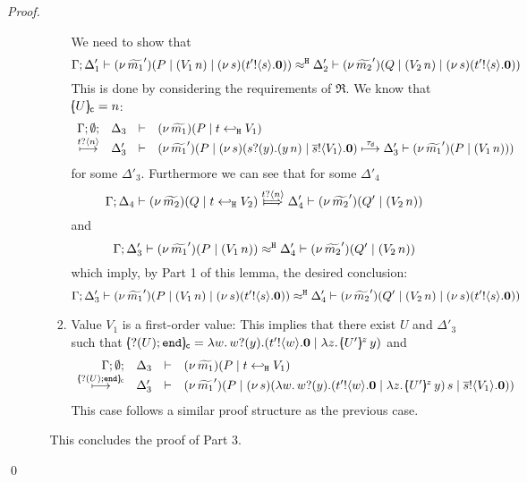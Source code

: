 \begin{proof}
\begin{enumerate}[$-$]
\begin{enumerate}[(a)]
\begin{enumerate}
							We need to show that
							\[
								\Gamma; \Delta_1' \vdash (\nu\, \widetilde{m_1}')(P \;|\; (V_1\, {n}) \;|\; (\nu\, s)(t' ! \langle s \rangle . \mathbf{0})) \approx^\mathtt{H} \Delta_2' \vdash (\nu\, \widetilde{m_2}')(Q \;|\; (V_2\, {n}) \;|\; (\nu\, s)(t' ! \langle s \rangle . \mathbf{0}))
							\]
							This is done by considering the requirements of $\Re$.
							We know that $[\!\!(U)\!\!]_{\mathsf{c}} = n$:
							\[
								\begin{array}{rcll} \Gamma; \emptyset; &\Delta_3& \vdash& (\nu\, \widetilde{m_1})(P \;|\; t \hookleftarrow_{\mathtt{H}} V_1  ) \\ \stackrel{t ? \langle n \rangle}{\longmapsto} &\Delta_3'& \vdash &  (\nu\, \widetilde{m_1}')(P \;|\; (\nu\, s)(s ? (y) . (y\, {n}) \;|\; \overline{s} ! \langle V_1 \rangle . \mathbf{0})  \stackrel{\tau_{\mathsf{d}}}{\longmapsto} \Delta'_3 \vdash (\nu\, \widetilde{m_1}')(P \;|\; (V_1\, {n})) ) \end{array} 
							\]
							for some $\Delta'_3$.
							Furthermore we can see that for some $\Delta'_4$
							\[
								\horel{\Gamma}{\Delta_4}{\newsp{\widetilde{m_2}}{Q \Par \htrigger{t}{V_2}  } }
								{\Hby{\bactinp{t}{n}}}
								{\Delta_4'}{\newsp{\widetilde{m_2}'}{Q' \Par (\appl{V_2}{n})}}
							\]
							and
							\[
								\Gamma; \Delta_3' \vdash (\nu\, \widetilde{m_1}')(P \;|\; (V_1\, {n})) \approx^\mathtt{H} \Delta_4' \vdash (\nu\, \widetilde{m_2}')(Q' \;|\; (V_2\, {n}))
							\]
							which imply, by Part 1 of this lemma, the desired conclusion:
							\[
								\Gamma; \Delta_3' \vdash (\nu\, \widetilde{m_1}')(P \;|\; (V_1\, {n}) \;|\; (\nu\, s)(t' ! \langle s \rangle . \mathbf{0})) \approx^\mathtt{H} \Delta_4' \vdash (\nu\, \widetilde{m_2}')(Q' \;|\; (V_2\, {n}) \;|\; (\nu\, s)(t' ! \langle s \rangle . \mathbf{0}))
							\]

						\item	Value $V_1$ is a first-order value: This implies that there exist $U$ and $\Delta'_3$
								such that $\omapchar{\btinp{U} \tinact} = \abs{w}{ \binp{w}{y} ( \bout{t'}{w} \inact \Par \appl{\abs{z}{\mapchar{U'}{z}}}{y} ) } $
								and
								\[	
									\mhorel{\Gamma}{\Delta_3}{\newsp{\widetilde{m_1}}{P \Par \htrigger{t}{V_1}  } }
									{\hby{\omapchar{\btinp{U}\tinact}}}
									{\Delta_3'}{}
									{\newsp{\widetilde{m_1}'}{P \Par \newsp{s}{\appl{\abs{w}{ \binp{w}{y} ( \bout{t'}{w} \inact \Par \appl{\abs{z}{\mapchar{U'}{z}}}{y} ) }}{s} \Par \bout{\dual{s}}{V_1} \inact}}}
								\]
							This case follows a similar proof structure as the previous case.
				\end{enumerate}
				This concludes the proof of Part 3. 
	\end{enumerate}
\end{enumerate}
\qed
\end{proof}


